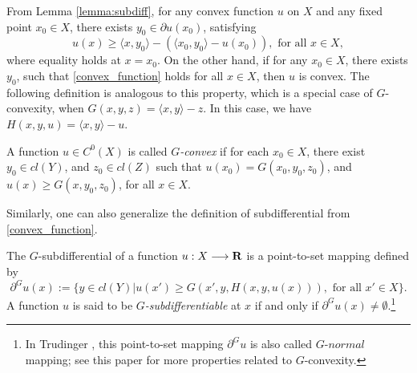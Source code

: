 From Lemma \ref{lemma:subdiff}, for any convex function $u$ on $X$ and any fixed point $x_0 \in X$, there exists $y_0 \in \partial u(x_0)$, satisfying%
\begin{equation}\label{convex_function}
	u(x) \ge  \langle x , y_0\rangle -( \langle x_0, y_0\rangle -  u(x_0)),	\text{  for all $x \in X$},
\end{equation} 
where equality holds at $x = x_0$. On the other hand, if for any $x_0\in X$, there exists $y_0$, such that \eqref{convex_function} holds for all $x\in X$, then $u$ is convex. The following definition is analogous to this property, which is a special case of $G$-convexity, when $G(x,y,z) = \langle x, y \rangle -z$. In this case, we have $H(x,y,u) = \langle x, y \rangle -u$. \medskip
	
\begin{definition}[$G$-convexity]\label{defn:GConvexity}
 A function $u\in C^0(X)$ is called {\it $G$-convex} if for each $x_0 \in X$, there exist $y_0 \in   cl(Y)$, and $z_0 \in  cl(Z)$ such that $u(x_0)=G(x_0, y_0, z_0)$, and $u(x)\ge G(x, y_0, z_0)$, for all $x\in X$.
\end{definition}
		
		
Similarly, one can also generalize the definition of subdifferential from \eqref{convex_function}.\medskip
		
\begin{definition}[$G$-subdifferentiability]\label{defn:GSubdifferential}
	The $G$-subdifferential of a 
	function $u: X \longrightarrow {\mathbf R}$ is a point-to-set mapping defined by
	\begin{equation*}
			\partial^G u(x):= \{ y\in  cl(Y)| u(x')\ge G(x',y, H(x,y,u(x))), \text{ for all } x'\in X\}.
	\end{equation*}
	A function $u$ is said to be {\it $G$-subdifferentiable} at $x$ if and only if $\partial^G u(x) \neq \emptyset$.\footnote{In Trudinger \cite{Trudinger14}, this point-to-set mapping $\partial^G u$ is also called $G$-$normal$ mapping; see this paper for more properties related to $G$-convexity.}		
\end{definition}
			
